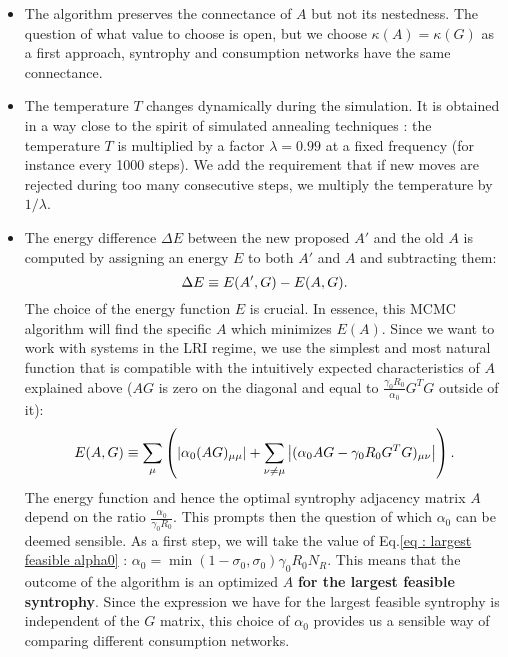 \documentclass[12pt, titlepage]{report}
\begin{document}
\begin{itemize}
\item The algorithm preserves the connectance of $A$ but not its nestedness. The question of what value to choose is open, but we choose $\kappa(A)=\kappa(G)$ as a first approach, \ie syntrophy and consumption networks have the same connectance.
\item The temperature $T$ changes dynamically during the simulation. It is obtained in a way close to the spirit of simulated annealing techniques \cite{gendreau_simulated_2019} : the temperature $T$ is multiplied by a factor $\lambda=0.99$ at a fixed frequency (for instance every 1000 steps). We add the requirement that if new moves are rejected during too many consecutive steps, we multiply the temperature by $1/\lambda$.
\item The energy difference $\Delta E$ between the new proposed $A'$ and the old $A$ is computed by assigning an energy $E$ to both $A'$ and $A$ and subtracting them:
\begin{equation}
\Delta E \equiv E(A', G)-E(A, G).
\end{equation}
The choice of the energy function $E$ is crucial. In essence, this MCMC algorithm will find the specific $A$ which minimizes $E(A)$. Since we want to work with systems in the LRI regime, we use the simplest and most natural function that is compatible with the intuitively expected characteristics of $A$ explained above (\ie $AG$ is zero on the diagonal and equal to $\frac{\gamma_0 R_0}{\alpha_0} G^TG$ outside of it):
\begin{equation}
E(A,G) \equiv \sum_\mu \left( \left|{\alpha_0(AG)_{\mu\mu}}\right| + \sum_{\nu\neq\mu} \left|{(\alpha_0 AG-\gamma_0 R_0 G^TG)_{\mu\nu} }\right|\right). \label{eq : dynamical stability methods LRI MC solver energy definition}
\end{equation}
The energy function and hence the optimal syntrophy adjacency matrix $A$ depend on the ratio $\frac{\alpha_0}{\gamma_0 R_0}$. This prompts then the question of which $\alpha_0$ can be deemed sensible. As a first step, we will take the value of Eq.\eqref{eq : largest feasible alpha0} : $\alpha_0 = \min(1-\sigma_0, \sigma_0) \gamma_0 R_0 N_R$. This means that the outcome of the algorithm is an optimized $A$ \textbf{for the largest feasible syntrophy}. Since the expression we have for the largest feasible syntrophy is independent of the $G$ matrix, this choice of $\alpha_0$ provides us a sensible way of comparing different consumption networks.
\end{itemize}
\end{document}
